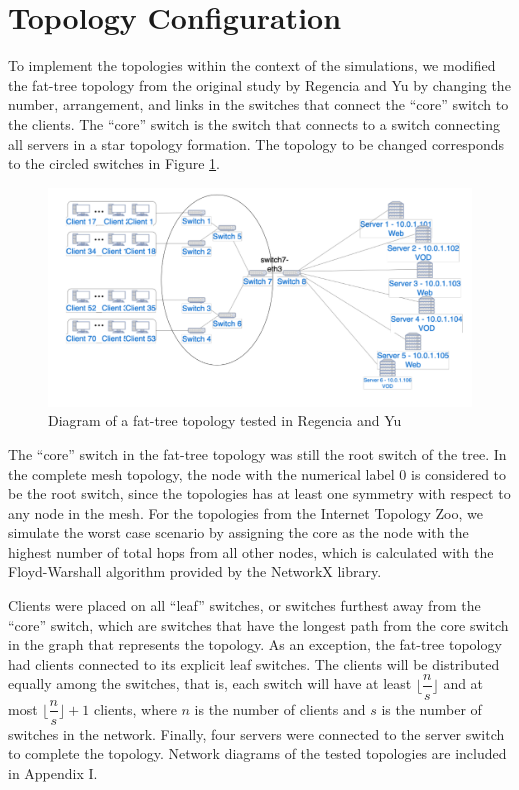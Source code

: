 \section{Topology Configuration} \label{sec:topo_config}
To implement the topologies within the context of the simulations, we modified the fat-tree topology from the original study by Regencia and Yu by changing the number, arrangement, and links in the switches that connect the ``core'' switch to the clients. The ``core'' switch is the switch that connects to a switch connecting all servers in a star topology formation. The topology to be changed corresponds to the circled switches in Figure \ref{fig:original_topology}.

\begin{figure}[htbp]
    \centering
    \includegraphics[width=\textwidth]{Figures/original_topology.png}
    \caption{Diagram of a fat-tree topology tested in Regencia and Yu}
    \label{fig:original_topology}
\end{figure}

The ``core'' switch in the fat-tree topology was still the root switch of the tree. In the complete mesh topology, the node with the numerical label $0$ is considered to be the root switch, since the topologies has at least one symmetry with respect to any node in the mesh. For the topologies from the Internet Topology Zoo, we simulate the worst case scenario by assigning the core as the node with the highest number of total hops from all other nodes, which is calculated with the Floyd-Warshall algorithm provided by the NetworkX library.

Clients were placed on all ``leaf'' switches, or switches furthest away from the ``core'' switch, which are switches that have the longest path from the core switch in the graph that represents the topology. As an exception, the fat-tree topology had clients connected to its explicit leaf switches. The clients will be distributed equally among the switches, that is, each switch will have at least $\lfloor\dfrac{n}{s} \rfloor$ and at most $\lfloor{\dfrac{n}{s}}\rfloor + 1$ clients, where $n$ is the number of clients and $s$ is the number of switches in the network. Finally, four servers were connected to the server switch to complete the topology. Network diagrams of the tested topologies are included in Appendix I.

